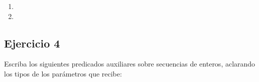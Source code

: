 \begin{enumerate}[label=\alph*)]
      \item {}

      \item {}
\end{enumerate}

\subsection{Ejercicio 4}
Escriba los siguientes predicados auxiliares sobre secuencias de enteros, aclarando los tipos de los parámetros que recibe:

